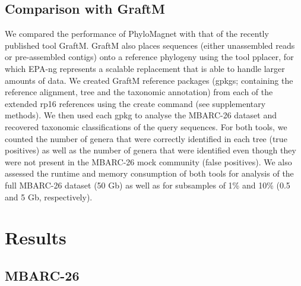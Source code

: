 \documentclass{bioinfo}
\begin{document}
\begin{methods}
\subsection{Comparison with GraftM}
We compared the performance of PhyloMagnet with that of the recently published tool GraftM. GraftM also places sequences (either unassembled reads or pre-assembled contigs) onto a reference phylogeny using the tool pplacer, for which EPA-ng represents a scalable replacement that is able to handle larger amounts of data.
We created GraftM reference packages (gpkgs; containing the reference alignment, tree and the taxonomic annotation) from each of the extended rp16 references using the create command (see supplementary methods). We then used each gpkg to analyse the MBARC-26 dataset and recovered taxonomic classifications of the query sequences.
For both tools, we counted the number of genera that were correctly identified in each tree (true positives) as well as the number of genera that were identified even though they were not present in the MBARC-26 mock community (false positives). We also assessed the runtime and memory consumption of both tools for analysis of the full MBARC-26 dataset (50 Gb) as well as for subsamples of 1\% and 10\% (0.5 and 5 Gb, respectively).

\end{methods}

\section{Results}
\subsection{MBARC-26}
\end{document}
